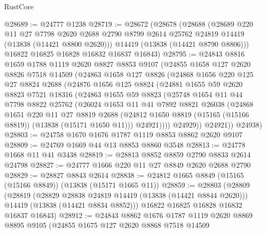 \begin{lexlean}{RustCore}
\begin{coremodule}
@28689 := @24777 @1238
@28719 := @28672
    (@28678
      (@28688
        (@28689
          @220
          @11
          @27
          @7798
          @2620
          @2688
          @2790
          @8799
          @2614
          @25762
          @24819
          @14419
          (@13838 (@14421 @8800 @2620)))
        @14419
        (@13838 (@14421 @8790 @8806)))
      @16822
      @16825
      @16828
      @16832
      @16837
      @16843)
@28795 := @24843
    @8816
    @1659
    @1788
    @1119
    @2620
    @8827
    @8853
    @9107
    (@24855
      @1658
      @127
      @2620
      @8826
      @7518
      @14509
      (@24863
        @1658
        @127
        @8826
        (@24868
          @1656
          @220
          @125
          @27
          @8824
          @2688
          (@24876
            @1656
            @125
            @8824
            (@24881
              @1655
              @59
              @2620
              @8823
              @7521
              @18316
              (@24863
                @1655
                @59
                @8823
                (@25748
                  @1654
                  @11
                  @44
                  @7798
                  @8822
                  @25762
                  (@26024
                    @1653
                    @11
                    @41
                    @7892
                    @8821
                    @26038
                    (@24868
                      @1651
                      @220
                      @11
                      @27
                      @8819
                      @2688
                      (@24812 @1650 @8819 (@15165 (@15166 @8819)) (@13838 (@15171 @1650 @11)))
                      @24921))))
              @24929))
          @24921))
      @24938)
@28803 := @24758 @1670 @1676 @1787 @1119 @8853 @8862 @2620 @9107
@28809 := @24769 @1669 @44 @13 @8853 @8860 @3548
@28813 := @24778 @1668 @11 @41 @3438
@28819 := @28813 @8852 @8859 @2790 @8833 @2614 @24798
@28827 := @24777 @1666 @220 @11 @27 @8849 @2620 @2688 @2790
@28829 := @28827 @8843 @2614
@28838 := @24812 @1665 @8849 (@15165 (@15166 @8849)) (@13838 (@15171 @1665 @11))
@28859 := @28803
    (@28809
      (@28819
        (@28829 @28838 @24819 @14419 (@13838 (@14421 @8844 @2620)))
        @14419
        (@13838 (@14421 @8834 @8852)))
      @16822
      @16825
      @16828
      @16832
      @16837
      @16843)
@28912 := @24843
    @8862
    @1676
    @1787
    @1119
    @2620
    @8869
    @8895
    @9105
    (@24855
      @1675
      @127
      @2620
      @8868
      @7518
      @14509

\end{coremodule}
\end{lexlean}
